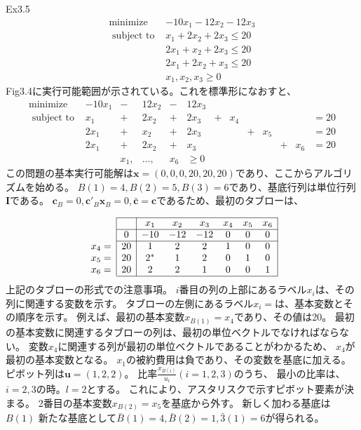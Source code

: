 \documentclass{jsarticle}
\begin{document}
Ex3.5\\
\begin{equation}
  \begin{array}{rr}
  \operatorname{minimize} & -10 x_{1}-12 x_{2}-12 x_{3} \\
  \text { subject to } & x_{1}+2 x_{2}+2 x_{3} \leq 20 \\
  &2 x_{1}+x_{2}+2 x_{3} \leq 20 \\
  &2 x_{1}+2 x_{2}+x_{3} \leq 20 \\
  & x_{1}, x_{2}, x_{3} \geq 0
  \end{array}
\end{equation}
Fig3.4に実行可能範囲が示されている。これを標準形になおすと、
\begin{equation}
  \begin{array}{rrrrrrrrrrrrrr}
    \operatorname{minimize} & -10 x_{1}&-&12 x_{2}&-&12 x_{3}&&&&&&& \\
    \text { subject to } & x_{1}&+&2 x_{2}&+&2 x_{3}&+&x_{4} &&&&& =20 \\
    &2 x_{1}&+&x_{2}&+&2 x_{3}&&&+&x_{5} &&& =20 \\
    &2 x_{1}&+&2 x_{2}&+&x_{3} &&&&& +&x_{6}&=20 \\
    &&x_{1},& \ldots,& x_{6}& \geq 0 &
  \end{array}
\end{equation}
この問題の基本実行可能解は$\bm{x}=(0,0,0,20,20,20)$であり、ここからアルゴリズムを始める。
$B(1)=4,B(2)=5,B(3)=6$であり、基底行列は単位行列$\bm{I}$である。
$\bm{c}_B=0,\bm{c}'_B\bm{x}_B=0,\bar{\bm{c}}=\bm{c}$であるため、最初のタブローは、

\begin{equation}
  \begin{array}{c|c|cccccc|}
    \cline{2-8} 
    && x_{1} & x_{2} & x_{3} & x_{4} & x_{5} & x_{6} \\
    \cline{2-8}   
    &0 & -10 & -12 & -12 & 0 & 0 & 0 \\
    \cline{2-8} 
    x_4=&20 & 1 & 2 & 2 & 1 & 0 & 0 \\
    x_5=&20 & 2^{*} & 1 & 2 & 0 & 1 & 0 \\
    x_6=&20 & 2 & 2 & 1 & 0 & 0 & 1 \\
    \cline{2-8} 
  \end{array}
\end{equation}
上記のタブローの形式での注意事項。
$i$番目の列の上部にあるラベル$x_i$は、その列に関連する変数を示す。
タブローの左側にあるラベル$x_i=$は、基本変数とその順序を示す。
例えば、最初の基本変数$x_{B(1)}=x_4$であり、その値は20。
最初の基本変数に関連するタブローの列は、最初の単位ベクトルでなければならない。
変数$x_4$に関連する列が最初の単位ベクトルであることがわかるため、
$x_4$が最初の基本変数となる。
$x_1$の被約費用は負であり、その変数を基底に加える。
ピボット列は$\bm{u}=(1,2,2)$。
比率$\frac{x_{B(i)}}{u_i}(i=1,2,3)$のうち、
最小の比率は、$i=2,3$の時。$l = 2$とする。
これにより、アスタリスクで示すピボット要素が決まる。
2番目の基本変数$x_{B(2)}=x_5$を基底から外す。
新しく加わる基底は$B(1)$
新たな基底として$\bar{B}(1)=4,\bar{B}(2)=1,\bar{3}(1)=6$が得られる。
\end{document}
